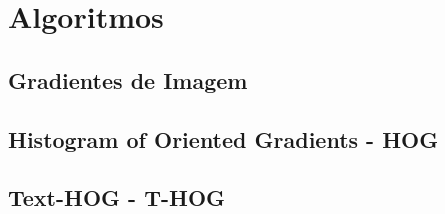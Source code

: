 \chapter{Algoritmos}

\section{Gradientes de Imagem}

\section{Histogram of Oriented Gradients - HOG}

\section{Text-HOG - T-HOG}

